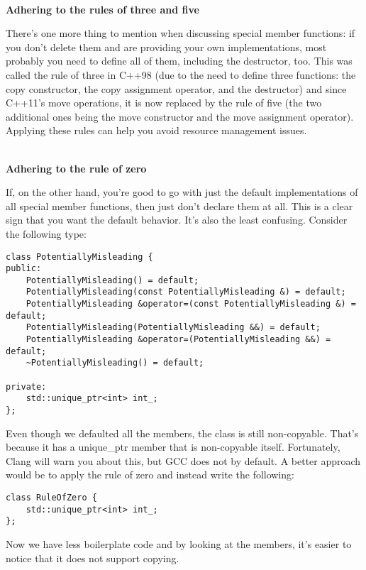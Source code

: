 \hspace*{\fill} \\ %
\noindent
\textbf{Adhering to the rules of three and five}

There's one more thing to mention when discussing special member functions: if you don't delete them and are providing your own implementations, most probably you need to define all of them, including the destructor, too. This was called the rule of three in C++98 (due to the need to define three functions: the copy constructor, the copy assignment operator, and the destructor) and since C++11's move operations, it is now replaced by the  rule of five (the two additional ones being the move constructor and the move assignment operator). Applying these rules can help you avoid resource management issues.

\hspace*{\fill} \\ %
\noindent
\textbf{Adhering to the rule of zero}

If, on the other hand, you're good to go with just the default implementations of all special member functions, then just don't declare them at all. This is a clear sign that you want the default behavior. It's also the least confusing. Consider the following type:

\begin{lstlisting}[style=styleCXX]
class PotentiallyMisleading {
public:
	PotentiallyMisleading() = default;
	PotentiallyMisleading(const PotentiallyMisleading &) = default;
	PotentiallyMisleading &operator=(const PotentiallyMisleading &) =
default;
	PotentiallyMisleading(PotentiallyMisleading &&) = default;
	PotentiallyMisleading &operator=(PotentiallyMisleading &&) = default;
	~PotentiallyMisleading() = default;
	
private:
	std::unique_ptr<int> int_;
};
\end{lstlisting}

Even though we defaulted all the members, the class is still non-copyable. That's because it has a unique\_ptr member that is non-copyable itself. Fortunately, Clang will warn you about this, but GCC does not by default. A better approach would be to apply the rule of zero and instead write the following:

\begin{lstlisting}[style=styleCXX]
class RuleOfZero {
	std::unique_ptr<int> int_;
};
\end{lstlisting}

Now we have less boilerplate code and by looking at the members, it's easier to notice that it does not support copying.

